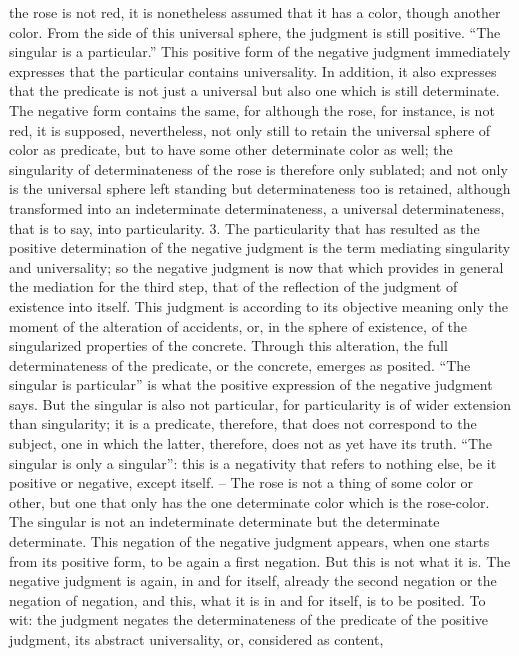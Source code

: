 the rose is not red, it is nonetheless assumed that it has a color, though
another color. From the side of this universal sphere, the judgment is still
positive.
“The singular is a particular.” This positive form of the negative judgment
immediately expresses that the particular contains universality. In addition,
it also expresses that the predicate is not just a universal but also one which
is still determinate. The negative form contains the same, for although
the rose, for instance, is not red, it is supposed, nevertheless, not only
still to retain the universal sphere of color as predicate, but to have some
other determinate color as well; the singularity of determinateness of the
rose is therefore only sublated; and not only is the universal sphere left
standing but determinateness too is retained, although transformed into
an indeterminate determinateness, a universal determinateness, that is to
say, into particularity.
3. The particularity that has resulted as the positive determination of the
negative judgment is the term mediating singularity and universality; so
the negative judgment is now that which provides in general the mediation
for the third step, that of the reflection of the judgment of existence into itself.
This judgment is according to its objective meaning only the moment of
the alteration of accidents, or, in the sphere of existence, of the singularized
properties of the concrete. Through this alteration, the full determinateness
of the predicate, or the concrete, emerges as posited.
“The singular is particular” is what the positive expression of the negative
judgment says. But the singular is also not particular, for particularity is of
wider extension than singularity; it is a predicate, therefore, that does not
correspond to the subject, one in which the latter, therefore, does not as yet
have its truth. “The singular is only a singular”: this is a negativity that refers
to nothing else, be it positive or negative, except itself. – The rose is not a
thing of some color or other, but one that only has the one determinate color
which is the rose-color. The singular is not an indeterminate determinate
but the determinate determinate.
This negation of the negative judgment appears, when one starts from
its positive form, to be again a first negation. But this is not what it is. The
negative judgment is again, in and for itself, already the second negation
or the negation of negation, and this, what it is in and for itself, is to be
posited. To wit: the judgment negates the determinateness of the predicate
of the positive judgment, its abstract universality, or, considered as content,
